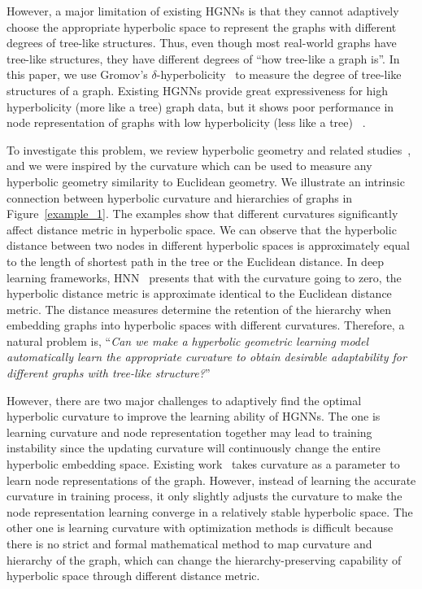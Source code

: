 However, a major limitation of existing HGNNs is that they cannot adaptively choose the appropriate hyperbolic space to represent the graphs with different degrees of tree-like structures.
Thus, even though most real-world graphs have tree-like structures, they have different degrees of ``how tree-like a graph is''. 
In this paper, we use Gromov’s $\delta$-hyperbolicity~\cite{adcock2013tree} to measure the degree of tree-like structures of a graph. 
Existing HGNNs provide great expressiveness for high hyperbolicity (more like a tree) graph data, but it shows poor performance in node representation of graphs with low hyperbolicity (less like a tree) ~\cite{HGCN_ChamiYRL19}. 


To investigate this problem, we review hyperbolic geometry and related studies~\cite{cannon1997hyperbolic,Krioukov2010Hyperbolic}, and we were inspired by the curvature which can be used to measure any hyperbolic geometry similarity to Euclidean geometry.
We illustrate an intrinsic connection between hyperbolic curvature and hierarchies of graphs in Figure~\ref{example_1}. 
The examples show that different curvatures significantly affect distance metric in hyperbolic space. 
We can observe that the hyperbolic distance between two nodes in different hyperbolic spaces is approximately equal to the length of shortest path in the tree or the Euclidean distance.
In deep learning frameworks, HNN~\cite{HNN:GaneaBH18} presents that with the curvature going to zero, the hyperbolic distance metric is approximate identical to the Euclidean distance metric. 
The distance measures determine the retention of the hierarchy when embedding graphs into hyperbolic spaces with different curvatures. 
Therefore, a natural problem is, “\textit{Can we make a hyperbolic geometric learning model automatically learn the appropriate curvature to obtain desirable adaptability for different graphs with tree-like structure?}” 

However, there are two major challenges to adaptively find the optimal hyperbolic curvature to improve the learning ability of HGNNs. 
The one is learning curvature and node representation together may lead to training instability since the updating curvature will continuously change the entire hyperbolic embedding space. 
Existing work~\cite{HGCN_ChamiYRL19} takes curvature as a parameter to learn node representations of the graph. However, instead of learning the accurate curvature in training process, it only slightly adjusts the curvature to make the node representation learning converge in a relatively stable hyperbolic space.
The other one is learning curvature with optimization methods is difficult because there is no strict and formal mathematical method to map curvature and hierarchy of the graph, which can change the hierarchy-preserving capability of hyperbolic space through different distance metric. 



